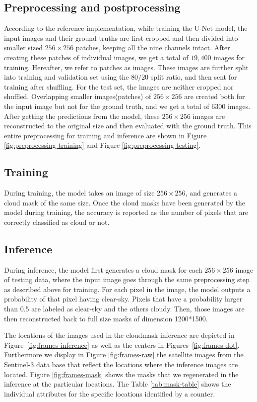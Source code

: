 \documentclass[sigplan,screen]{acmart}
\begin{document}
\subsection{Preprocessing and postprocessing} According to the reference implementation, while training the U-Net model, the input images and their ground truths are first cropped and then divided into smaller sized $256 \times 256$ patches, keeping all the nine channels intact. After creating these patches of individual images, we get a total of $19,400$ images for training. Hereafter, we refer to patches as images. These images are further split into training and validation set using the $80/20$ split ratio, and then sent for training after shuffling. 
For the test set, the images are neither cropped nor shuffled. Overlapping smaller images(patches) of $256 \times 256$ are created both for the input image but not for the ground truth, and we get a total of $6300$ images. After getting the predictions from the model, these  $256 \times 256$ images are reconstructed to the original size and then evaluated with the ground truth. This entire preprocessing for training and inference are shown in Figure \ref{fig:preprocessing-training} and Figure \ref{fig:preprocessing-testing}.

\subsection{Training}

During training, the model takes an image of size $256 \times 256$, and generates a cloud mask of the same size. Once the cloud masks have been generated by the model during training, the accuracy is reported as the number of pixels that are correctly classified as cloud or not. 

\subsection{Inference}

During inference, the model first generates a cloud mask for each $256 \times 256$ image of testing data, where the input image goes through the same preprocessing step as described above for training. For each pixel in the image, the model outputs a probability of that pixel having clear-sky. Pixels that have a probability larger than 0.5 are labeled as clear-sky and the others cloudy. Then, those images are then reconstructed back to full size masks of dimension 1200*1500. 

The locations of the images used in the cloudmask inference are depicted in Figure~\ref{fig:frames-inference} as well as the centers in Figures~\ref{fig:frames-dot}.
Furthermore we display in Figure \ref{fig:frames-raw} the satellite images from the Sentinel-3 data base that reflect the locations where the inference images are located. Figure \ref{fig:frames-mask} shows the masks that we regenerated in the inference at the particular locations.
The Table \ref{tab:mask-table} shows the individual attributes for the specific locations identified by a counter.
\end{document}
